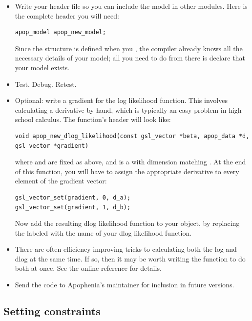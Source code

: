 \begin{itemize}
\item Write your header file so you can include the model in other
modules. Here is the complete header you will need:
\begin{lstlisting}
apop_model apop_new_model;
\end{lstlisting}
Since the  structure is defined when you , the compiler already knows all the necessary
details of your model; all you need to do from there is declare that
your model exists.


\item Test. Debug. Retest.

\item Optional: write a gradient for the log likelihood function. This
involves calculating a derivative by hand, which is typically an easy
problem in high-school calculus. The function's header will look like: 
\begin{lstlisting}
void apop_new_dlog_likelihood(const gsl_vector *beta, apop_data *d, gsl_vector *gradient)
\end{lstlisting}
where  and  are fixed as above, and  is a  with dimension matching . 
At the end of this function, you will have to assign the appropriate derivative to every element of the gradient vector:
\begin{lstlisting}
gsl_vector_set(gradient, 0, d_a);
gsl_vector_set(gradient, 1, d_b);
\end{lstlisting}
Now add the resulting dlog likelihood function to your object, by
replacing the  labeled  with
the name of your dlog likelihood function.  

\item There are often efficiency-improving tricks to calculating both the log and
dlog at the same time. If so, then it may be worth writing the 
function to do both at once. See the online reference for details.

\item Send the code to Apophenia's maintainer for inclusion in future
versions.  \end{itemize}


\subsection{Setting
constraints}\label{constraintwriting}

